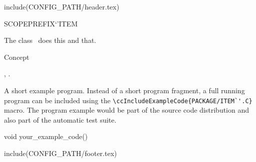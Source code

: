 include(CONFIG_PATH/header.tex)
\begin{ccRefClass}SCOPE{PREFIX`'ITEM}  %


\ccDefinition
  
The class \ccRefName\ does this and that.


\ccIsModel

Concept

\ccTypes


\ccCreation
{}  %


\ccOperations


\ccSeeAlso

,
.

\ccExample

A short example program.
Instead of a short program fragment, a full running program can be
included using the 
\verb|\ccIncludeExampleCode{PACKAGE/ITEM`'.C}| 
macro. The program example would be part of the source code distribution and
also part of the automatic test suite.

\begin{ccExampleCode}
void your_example_code() {
}
\end{ccExampleCode}


\end{ccRefClass}

include(CONFIG_PATH/footer.tex)
